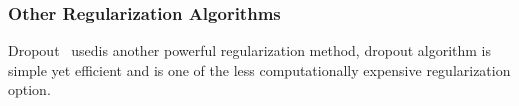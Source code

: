 \subsubsection{Other Regularization Algorithms}

Dropout~\cite{JMLR:v15:srivastava14a} usedis another powerful regularization method, dropout algorithm is simple yet efficient and is one of the less computationally expensive regularization option. 